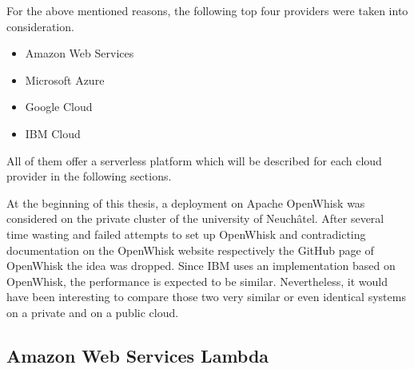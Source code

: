 For the above mentioned reasons, the following top four providers were taken into consideration.
\begin{itemize}
  \item Amazon Web Services
  \item Microsoft Azure
  \item Google Cloud
  \item IBM Cloud
\end{itemize}
All of them offer a serverless platform which will be described for each cloud provider in the following sections.

\begin{remark}
At the beginning of this thesis, a deployment on Apache OpenWhisk was considered on the private cluster of the university of Neuchâtel. After several time wasting and failed attempts to set up OpenWhisk and contradicting documentation on the OpenWhisk website respectively the GitHub page of OpenWhisk the idea was dropped. Since \gls{IBM} uses an implementation based on OpenWhisk, the performance is expected to be similar. Nevertheless, it would have been interesting to compare those two very similar or even identical systems on a private and on a public cloud.
\end{remark}

\subsection{Amazon Web Services Lambda}

